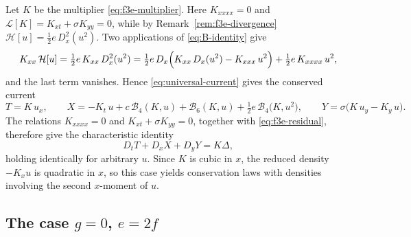 \documentclass[11pt]{article}
\numberwithin{equation}{section}
\theoremstyle{definition}
\theoremstyle{remark}
\begin{document}
Let $K$ be the multiplier \eqref{eq:f3e-multiplier}. Here
$K_{xxxx}=0$ and $\mathcal{L}[K]=K_{xt}+\sigma K_{yy}=0$, while by
Remark~\ref{rem:f3e-divergence} $\mathcal{H}[u]=\tfrac12 e\,D_x^2(u^2)$.
Two applications of \eqref{eq:B-identity} give
\begin{equation}
K_{xx}\,\mathcal{H}[u]
= \tfrac12 e\,K_{xx}\,D_x^2(u^2)
= \tfrac12 e\,D_x\Bigl(
K_{xx}\,D_x(u^2) - K_{xxx}\,u^2
\Bigr)
+ \tfrac12 e\,K_{xxxx}\,u^2 ,
\label{eq:f3e-residual}
\end{equation}
and the last term vanishes. Hence \eqref{eq:universal-current} gives
the conserved current
\begin{equation}
T = K\,u_x,
\qquad
X = -K_t\,u
+ c\,\mathcal{B}_4(K,u)
+ \mathcal{B}_6(K,u)
+ \tfrac12 e\,\mathcal{B}_4\bigl(K,u^2\bigr),
\qquad
Y = \sigma\bigl(K\,u_y - K_y\,u\bigr).
\label{eq:f3e-current}
\end{equation}
The relations $K_{xxxx}=0$ and
$K_{xt}+\sigma K_{yy}=0$, together with
\eqref{eq:f3e-residual}, therefore give the characteristic identity
\[
D_tT+D_xX+D_yY=K\Delta,
\]
holding identically for arbitrary $u$.
Since $K$ is cubic in $x$, the reduced density $-K_x u$ is quadratic
in $x$, so this case yields conservation laws with densities
involving the second $x$-moment of $u$.

\subsection{The case \texorpdfstring{$g=0$, $e=2f$}{g=0, e=2f}}
\end{document}
